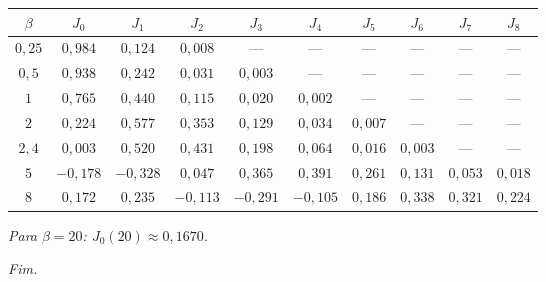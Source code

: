 \documentclass[11pt,a4paper]{article}
\begin{document}
\vfill

\begin{instrucao}
\centering\small
\begin{tabular}{c|ccccccccc}
\toprule
$\beta$ & $J_0$ & $J_1$ & $J_2$ & $J_3$ & $J_4$ & $J_5$ & $J_6$ & $J_7$ & $J_8$ \\
\midrule
$0{,}25$ & $0{,}984$ & $0{,}124$ & $0{,}008$ & --- & --- & --- & --- & --- & --- \\
$0{,}5$  & $0{,}938$ & $0{,}242$ & $0{,}031$ & $0{,}003$ & --- & --- & --- & --- & --- \\
$1$      & $0{,}765$ & $0{,}440$ & $0{,}115$ & $0{,}020$ & $0{,}002$ & --- & --- & --- & --- \\
$2$      & $0{,}224$ & $0{,}577$ & $0{,}353$ & $0{,}129$ & $0{,}034$ & $0{,}007$ & --- & --- & --- \\
$2{,}4$  & $0{,}003$ & $0{,}520$ & $0{,}431$ & $0{,}198$ & $0{,}064$ & $0{,}016$ & $0{,}003$ & --- & --- \\
$5$      & $-0{,}178$ & $-0{,}328$ & $0{,}047$ & $0{,}365$ & $0{,}391$ & $0{,}261$ & $0{,}131$ & $0{,}053$ & $0{,}018$ \\
$8$      & $0{,}172$ & $0{,}235$ & $-0{,}113$ & $-0{,}291$ & $-0{,}105$ & $0{,}186$ & $0{,}338$ & $0{,}321$ & $0{,}224$ \\
\bottomrule
\end{tabular}

\vspace{0.2cm}\small\textit{Para $\beta = 20$: $J_0(20) \approx 0{,}1670$.}
\end{instrucao}

\vfill
\begin{center}
  \small\textit{Fim.}
\end{center}
\end{document}
